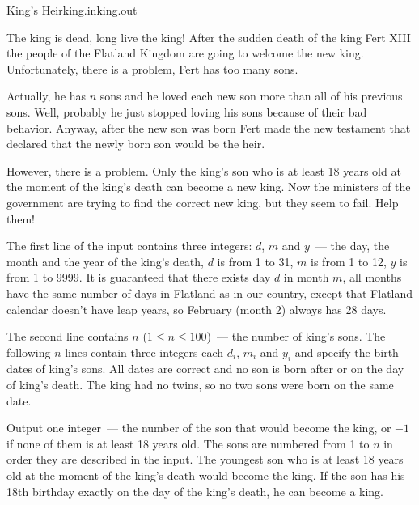 \begin{problem}{King's Heir}{king.in}{king.out}{\timeLimit}


The king is dead, long live the king! After the sudden death of the king 
Fert XIII the people of the Flatland Kingdom are going
to welcome the new king. Unfortunately, there is a problem,
Fert has too many sons. 

Actually, he has $n$ sons and he loved each new son more
than all of his previous sons. Well, probably he just stopped loving
his sons because of their bad behavior. Anyway, after the new son 
was born Fert made the new testament that declared that the newly born son
would be the heir.

However, there is a problem. Only the king's son who is at least
18 years old at the moment of the king's death can become a new king.
Now the ministers of the government are trying to find the correct
new king, but they seem to fail. Help them!

\InputFile

The first line of the input contains three integers: $d$, $m$ and $y$~---
the day, the month and the year of the king's death, $d$ is from 1 to 31,
$m$ is from 1 to 12, $y$ is from 1 to 9999. It is guaranteed that there
exists day $d$ in month $m$, all months have the same number of days
in Flatland as in our country, except that Flatland calendar doesn't have
leap years, so February (month 2) always has 28 days.

The second line contains $n$ ($1 \le n \le 100$)~--- the number of king's sons.
The following $n$ lines contain three integers each $d_i$, $m_i$ and $y_i$
and specify the birth dates of king's sons. All dates are correct and no son is born after or on the day of king's death.
The king had no twins, so 
no two sons were born on the same date.

\OutputFile

Output one integer~--- the number of the son that would become the king, or
$-1$ if none of them is at least 18 years old.
The sons are numbered from 1 to $n$ in order they are described in the input.
The youngest son who is at least 18 years old at the moment of the king's
death would become the king. If the son has his 18th birthday exactly
on the day of the king's death, he can become a king.

\Examples

\begin{example}
%
%
\end{example}

\end{problem}

